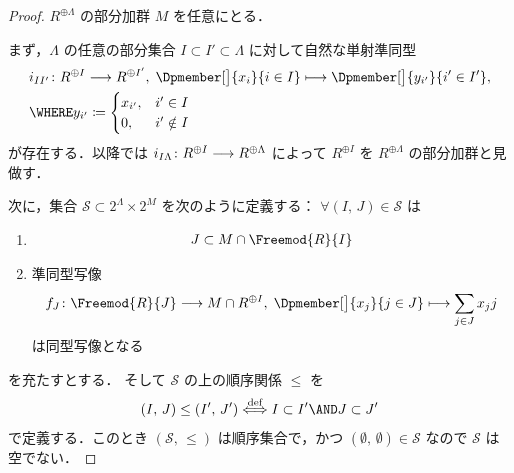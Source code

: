 \documentclass[algtopo_main]{subfiles}
\begin{document}
\begin{proof}
    $R^{\oplus\Lambda}$ の部分加群 $M$ を任意にとる．

    まず，$\Lambda$ の任意の部分集合 $I \subset I' \subset \Lambda$ に対して自然な単射準同型
    \begin{align}
        &i_{II'} \colon R^{\oplus I} \lto R^{\oplus I'},\; \Dpmember[\big]{x_i}{i \in I} \lmto \Dpmember[\big]{y_{i'}}{i' \in I'}, \\
        &\WHERE y_{i'} \coloneqq 
        \begin{cases}
            x_{i'}, & i' \in I \\
            0, &i' \notin I
        \end{cases}
    \end{align}
    が存在する．以降では $i_{I\Lambda} \colon R^{\oplus I} \longrightarrow R^{\oplus \Lambda}$ によって $R^{\oplus I}$ を $R^{\oplus \Lambda}$ の部分加群と見做す．

    次に，集合 $\mathcal{S} \subset 2^\Lambda \times 2^M$ を次のように定義する：
    $\forall (I,\, J) \in \mathcal{S}$ は
    \begin{enumerate}
        \item 
        \begin{align}
            J \subset M \cap \Freemod{R}{I}
        \end{align}
        \item 準同型写像
        \begin{align}
            \label{eq:iso-PID}
            f_J \colon \Freemod{R}{J} \lto M \cap R^{\oplus I},\; \Dpmember[\big]{x_j}{j \in J} \lmto \sum_{j \in J} x_j j
        \end{align}
        は同型写像となる
    \end{enumerate}
    を充たすとする．
    そして $\mathcal{S}$ の上の順序関係 $\le$ を
    \begin{align}
        (I,\, J) \le (I',\, J') \stackrel{\text{def}}{\Longleftrightarrow} I \subset I' \AND J \subset J'
    \end{align}
    で定義する．このとき $(\mathcal{S},\, \le)$ は順序集合で，かつ $(\emptyset,\, \emptyset) \in \mathcal{S}$ なので $\mathcal{S}$ は空でない．


\end{proof}
\end{document}
